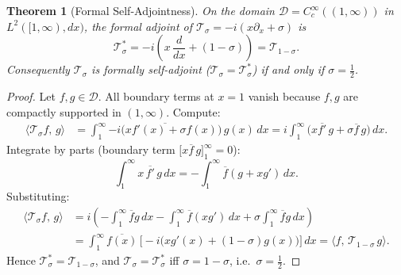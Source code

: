 \documentclass[11pt]{article}
\newtheorem{theorem}{Theorem}[section]
\begin{document}
\begin{theorem}[Formal Self-Adjointness]
\label{thm:formal_sa}
On the domain $\mathcal{D} = C_c^\infty((1,\infty))$ in $L^2([1,\infty),dx)$, the
formal adjoint of $\mathcal{T}_\sigma = -i(x\partial_x + \sigma)$ is
\[
  \mathcal{T}_\sigma^{*} = -i\!\left(x\,\frac{d}{dx} + (1-\sigma)\right)
                         = \mathcal{T}_{1-\sigma}.
\]
Consequently $\mathcal{T}_\sigma$ is formally self-adjoint
($\mathcal{T}_\sigma = \mathcal{T}_\sigma^*$) if and only if $\sigma = \tfrac12$.
\end{theorem}

\begin{proof}
Let $f, g \in \mathcal{D}$.  All boundary terms at $x=1$ vanish because
$f, g$ are compactly supported in $(1,\infty)$.  Compute:
\begin{align*}
  \langle \mathcal{T}_\sigma f,\, g \rangle
  &= \int_1^\infty \overline{-i\bigl(xf'(x)+\sigma f(x)\bigr)}\,g(x)\,dx
   = i\int_1^\infty \bigl(x\overline{f'}\,g + \sigma\overline{f}\,g\bigr)\,dx.
\end{align*}
Integrate by parts (boundary term $\bigl[x\overline{f}\,g\bigr]_1^\infty = 0$):
\[
  \int_1^\infty x\,\overline{f'}\,g\,dx
  = -\int_1^\infty \overline{f}(g + xg')\,dx.
\]
Substituting:
\begin{align*}
  \langle \mathcal{T}_\sigma f,\, g \rangle
  &= i\!\left(-\int_1^\infty\overline{f}g\,dx
    - \int_1^\infty\overline{f}(xg')\,dx
    + \sigma\int_1^\infty\overline{f}g\,dx\right) \\
  &= \int_1^\infty\overline{f(x)}\,\bigl[-i\bigl(xg'(x)+(1-\sigma)g(x)\bigr)\bigr]\,dx
   = \langle f,\,\mathcal{T}_{1-\sigma}\,g\rangle.
\end{align*}
Hence $\mathcal{T}_\sigma^* = \mathcal{T}_{1-\sigma}$, and
$\mathcal{T}_\sigma = \mathcal{T}_\sigma^*$ iff $\sigma = 1-\sigma$,
i.e.\ $\sigma = \tfrac12$.
\end{proof}
\end{document}
